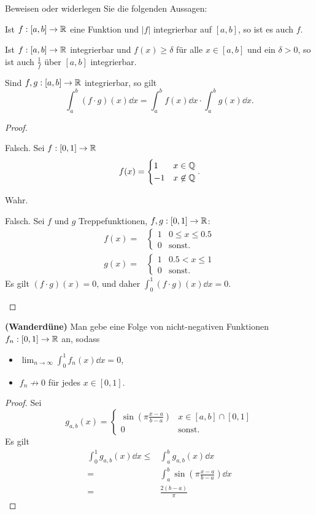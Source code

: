 \begin{Problem}
	Beweisen oder widerlegen Sie die folgenden Aussagen:
	\begin{parts}
	\item Ist $f:[a,b]\to \mathbb{R}$ eine Funktion und $|f|$ integrierbar auf $[a,b]$, so ist es auch $f$.
	\item Ist $f:[a,b]\to \mathbb{R}$ integrierbar und $f(x)\ge \delta$ f\"{u}r alle $x\in [a,b]$ und ein $\delta>0$, so ist auch $\frac{1}{f}$ \"{u}ber $[a,b]$ integrierbar.
	\item Sind $f,g:[a,b]\to \mathbb{R}$ integrierbar, so gilt
		\[
			\int_a^b(f\cdot g)(x)\dd{x}=\int_a^b f(x)\dd{x}\cdot \int_a^b g(x)\dd{x}
		.\] 
	\end{parts}
\end{Problem}
\begin{proof}
	\begin{parts}
	\item Falsch. Sei $f:[0,1]\to \mathbb{R}$
		\[
		f(x)=\begin{cases}
			1 & x\in \mathbb{Q}\\
			-1 & x\not\in \mathbb{Q}
		\end{cases}
		.\] 
	\item Wahr.
	\item Falsch. Sei $f$ und $g$ Treppefunktionen, $f,g:[0,1]\to \mathbb{R}$:
		\begin{align*}
			f(x)=&\begin{cases}
				1 & 0 \le x \le 0.5\\
				0 & \text{sonst}.
			\end{cases}\\
				g(x)=&\begin{cases}
					1 & 0.5 < x \le 1\\
					0 & \text{sonst}.
				\end{cases}
		\end{align*}
		Es gilt $(f\cdot g)(x)=0$, und daher $\int_0^1 (f\cdot g)(x)\dd{x}=0$.
	\end{parts}
\end{proof}
\begin{Problem}
	\textbf{(Wanderdüne)}	Man gebe eine Folge von nicht-negativen Funktionen $f_n:[0,1]\to \mathbb{R}$ an, sodass
	\begin{itemize}
		\item $\lim_{n \to \infty} \int_0^1 f_n(x)\dd{x}=0$,
		\item $f_n\not\to0$ f\"{u}r jedes $x\in [0,1]$.
	\end{itemize}
\end{Problem}
\begin{proof}
	Sei
	\[
		g_{a,b}(x)=\begin{cases}
			\sin\left( \pi \frac{x-a}{b-a} \right) & x\in [a,b]\cap [0,1]\\
			0 & \text{sonst}.
		\end{cases}
	\]
	Es gilt
	\begin{align*}
		\int_0^1 g_{a,b}(x)\dd{x}\le& \int_a^b g_{a,b}(x)\dd{x}\\
		=&\int_a^b \sin\left( \pi \frac{x-a}{b-a} \right) \dd{x}\\
		=&\frac{2(b-a)}{\pi}
	\end{align*}
\end{proof}
